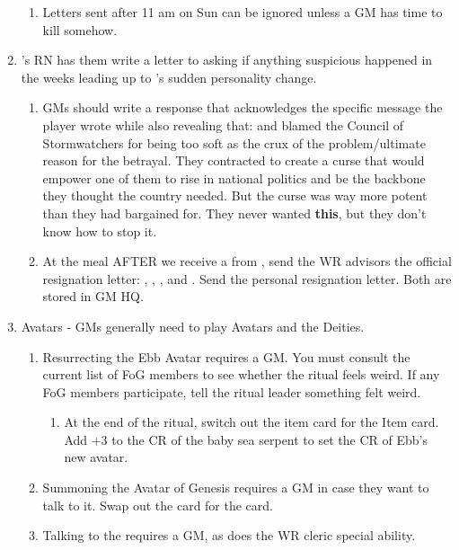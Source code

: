 \documentclass[green]{GL2020}
\begin{document}
\begin{enumerate}
	\begin{enumerate}
		\item Letters sent after 11 am on Sun can be ignored unless a GM has time to kill somehow.
	\end{enumerate}
	\item \cWarlordDaughter{}’s RN has them write a letter to \cQuiet{} asking if anything suspicious happened in the weeks leading up to \cLoud{}'s sudden personality change.
	\begin{enumerate}
		\item GMs should write a response that acknowledges the specific message the player wrote while also revealing that: \cLoud{} and \cQuiet{} blamed the Council of Stormwatchers for being too soft as the crux of the problem/ultimate reason for the betrayal. They contracted \cCurse{\full} to create a curse that would empower one of them to rise in national politics and be the backbone they thought the country needed. But the curse was way more potent than they had bargained for. They never wanted \textbf{this}, but they don’t know how to stop it.
		\item At the meal AFTER we receive a \iPanacea{} from \cWarlordDaughter{}, send the WR advisors the official resignation letter: \cChupLeader{}, \cJuniorStatesman{}, \cBunker{}, and \cEbbPriest{}. Send \cWarlordDaughter{} the personal resignation letter. Both are stored in GM HQ.
	\end{enumerate}
	\item Avatars - GMs generally need to play Avatars and the Deities.
	\begin{enumerate}
		\item Resurrecting the Ebb Avatar requires a GM. You must consult the current list of FoG members to see whether the ritual feels weird. If any FoG members participate, tell the ritual leader something felt weird.
		\begin{enumerate}
			\item At the end of the ritual, switch out the \iBabySeaSerpent{} item card for the \iAvatarSeaSerpent{} Item card. Add +3 to the CR of the baby sea serpent to set the CR of Ebb’s new avatar.
		\end{enumerate}
		\item Summoning the Avatar of Genesis requires a GM in case they want to talk to it. Swap out the \iRabbitStatue{} card for the \iAvatarRabbit{} card.
		\item Talking to the \iAvatarBeetle{} requires a GM, as does the WR cleric special ability.
	\end{enumerate}

\end{enumerate}
\end{document}

